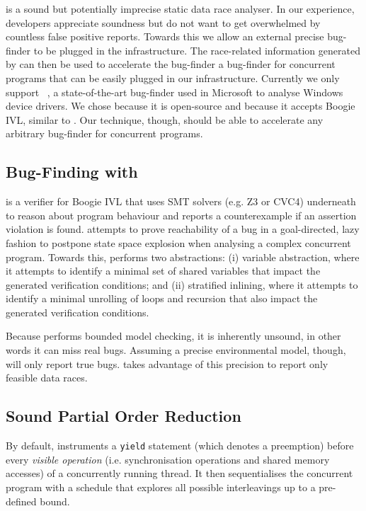 \whoop is a sound but potentially imprecise static data race analyser. In our experience, developers appreciate soundness but do not want to get overwhelmed by countless false positive reports. Towards this we allow an external precise bug-finder to be plugged in the \whoop infrastructure. The race-related information generated by \whoop can then be used to accelerate the bug-finder a bug-finder for concurrent programs that can be easily plugged in our infrastructure. Currently we only support \corral~\cite{lal2012corral}, a state-of-the-art bug-finder used in Microsoft to analyse Windows device drivers. We chose \corral because it is open-source and because it accepts Boogie IVL, similar to \whoop. Our technique, though, should be able to accelerate any arbitrary bug-finder for concurrent programs.

\subsection{Bug-Finding with \corral}
\label{bf:corral}

\corral is a verifier for Boogie IVL that uses SMT solvers (e.g. Z3 or CVC4) underneath to reason about program behaviour and reports a counterexample if an assertion violation is found. \corral attempts to prove reachability of a bug in a goal-directed, lazy fashion to postpone state space explosion when analysing a complex concurrent program. Towards this, \corral performs two abstractions: (i) variable abstraction, where it attempts to identify a minimal set of shared variables that impact the generated verification conditions; and (ii) stratified inlining, where it attempts to identify a minimal unrolling of loops and recursion that also impact the generated verification conditions.

Because \corral performs bounded model checking, it is inherently unsound, in other words it can miss real bugs. Assuming a precise environmental model, though, \corral will only report true bugs. \whoop takes advantage of this precision to report only feasible data races.

\subsection{Sound Partial Order Reduction}
\label{bf:reduction}

By default, \corral instruments a \texttt{yield} statement (which denotes a preemption) before every \emph{visible operation} (i.e. synchronisation operations and shared memory accesses) of a concurrently running thread. It then sequentialises the concurrent program with a schedule that explores all possible interleavings up to a pre-defined bound.

